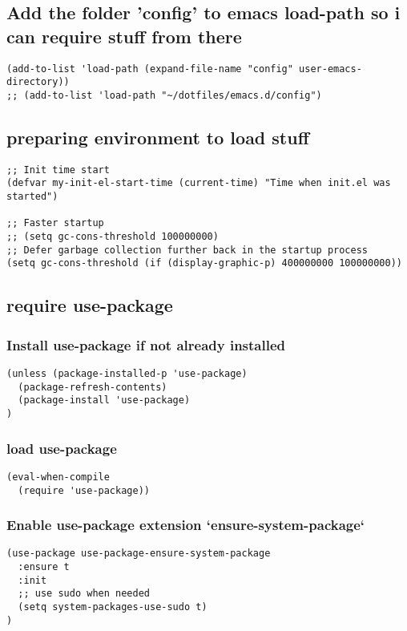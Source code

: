 \documentclass[11pt]{article}
\begin{document}
\subsection*{Add the folder 'config' to emacs load-path so i can require stuff from there}
\label{sec:org1b3acdc}

\begin{verbatim}
(add-to-list 'load-path (expand-file-name "config" user-emacs-directory))
;; (add-to-list 'load-path "~/dotfiles/emacs.d/config")
\end{verbatim}

\subsection*{preparing environment to load stuff}
\label{sec:org47beffb}

\begin{verbatim}
;; Init time start
(defvar my-init-el-start-time (current-time) "Time when init.el was started")

;; Faster startup
;; (setq gc-cons-threshold 100000000)
;; Defer garbage collection further back in the startup process
(setq gc-cons-threshold (if (display-graphic-p) 400000000 100000000))
\end{verbatim}
\subsection*{require use-package}
\label{sec:orga292658}

\subsubsection*{Install use-package if not already installed}
\label{sec:orgbdb834b}
\begin{verbatim}
(unless (package-installed-p 'use-package)
  (package-refresh-contents)
  (package-install 'use-package)
)
\end{verbatim}

\subsubsection*{load use-package}
\label{sec:org5dcd1eb}
\begin{verbatim}
(eval-when-compile
  (require 'use-package))
\end{verbatim}

\subsubsection*{Enable use-package extension `ensure-system-package`}
\label{sec:org4cd4118}
\begin{verbatim}
(use-package use-package-ensure-system-package
  :ensure t
  :init
  ;; use sudo when needed
  (setq system-packages-use-sudo t)
)
\end{verbatim}
\end{document}

